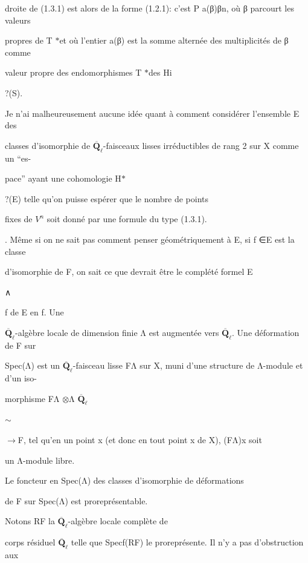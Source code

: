 \documentclass[11pt]{article}
\begin{document}
\noindent droite de (1.3.1) est alors de la forme (1.2.1): c’est P a(β)βn, où β parcourt les valeurs\par
\noindent propres de T \(*\)et où l’entier a(β) est la somme alternée des multiplicités de β comme\par
\noindent valeur propre des endomorphismes T \(*\)des Hi\par
\noindent ?(S).\par
\noindent Je n’ai malheureusement aucune idée quant à comment considérer l’ensemble E des\par
\noindent classes d’isomorphie de \(\overline{\mathbf Q}_{\ell}\)-faisceaux lisses irréductibles de rang 2 sur X comme un “es-\par
\noindent pace” ayant une cohomologie H\(*\)\par
\noindent ?(E) telle qu’on puisse espérer que le nombre de points\par
\noindent fixes de \(V^n\) soit donné par une formule du type (1.3.1).\par
{}. Même si on ne sait pas comment penser géométriquement à E, si f ∈E est la classe\par
\noindent d’isomorphie de F, on sait ce que devrait être le complété formel E\par
\noindent ∧\par
\noindent f de E en f. Une\par
\noindent \(\overline{\mathbf Q}_{\ell}\)-algèbre locale de dimension finie Λ est augmentée vers \(\overline{\mathbf Q}_{\ell}\). Une déformation de F sur\par
\noindent Spec(Λ) est un \(\overline{\mathbf Q}_{\ell}\)-faisceau lisse FΛ sur X, muni d’une structure de Λ-module et d’un iso-\par
\noindent morphisme FΛ \(\otimes\)Λ \(\overline{\mathbf Q}_{\ell}\)\par
\noindent \(\sim\)\par
\noindent \(\to\)F, tel qu’en un point x (et donc en tout point x de X), (FΛ)x soit\par
\noindent un Λ-module libre.\par
\noindent Le foncteur en Spec(Λ) des classes d’isomorphie de déformations\par
\noindent de F sur Spec(Λ) est proreprésentable.\par
\noindent Notons RF la \(\overline{\mathbf Q}_{\ell}\)-algèbre locale complète de\par
\noindent corps résiduel \(\overline{\mathbf Q}_{\ell}\) telle que Specf(RF) le proreprésente. Il n’y a pas d’obstruction aux\par
\end{document}
